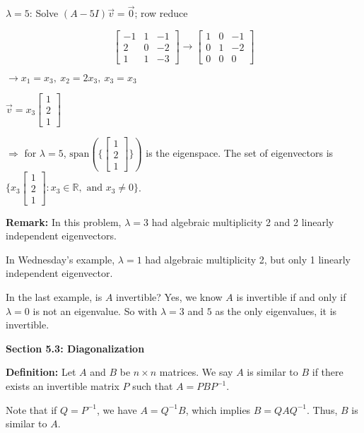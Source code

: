 \documentclass{article}
\begin{document}
\(\lambda = 5\): Solve \((A-5I)\vec{v} = \vec{0}\); row reduce

\[
\begin{bmatrix} -1 & 1 & -1 \\ 2 & 0 & -2 \\ 1 & 1 & -3 \end{bmatrix} \rightarrow \begin{bmatrix} 1 & 0 & -1 \\ 0 & 1 & -2 \\ 0 & 0 & 0 \end{bmatrix}
\]

\(\rightarrow x_1 = x_3, \ x_2 = 2x_3, \ x_3 = x_3\)

\(\vec{v} = x_3\begin{bmatrix} 1 \\ 2 \\ 1 \end{bmatrix}\)



\(\Rightarrow\) for \(\lambda = 5\), \(\text{span}(\{\begin{bmatrix} 1 \\ 2 \\ 1 \end{bmatrix}\})\) is the eigenspace. The set of eigenvectors is \(\{x_3\begin{bmatrix} 1 \\ 2 \\ 1 \end{bmatrix} : x_3 \in \mathbb{R}, \text{ and } x_3 \neq 0\}\).

\textbf{Remark:} In this problem, \(\lambda = 3\) had algebraic multiplicity 2 and 2 linearly independent eigenvectors.

In Wednesday's example, \(\lambda = 1\) had algebraic multiplicity 2, but only 1 linearly independent eigenvector.

In the last example, is \(A\) invertible? Yes, we know \(A\) is invertible if and only if \(\lambda = 0\) is not an eigenvalue. So with \(\lambda = 3\) and \(5\) as the only eigenvalues, it is invertible.


\textbf{Section 5.3: Diagonalization}

\textbf{Definition:} Let \( A \) and \( B \) be \( n \times n \) matrices. We say \( A \) is similar to \( B \) if there exists an invertible matrix \( P \) such that \( A = PBP^{-1} \).

Note that if \( Q = P^{-1} \), we have \( A = Q^{-1}B \), which implies \( B = QAQ^{-1} \). Thus, \( B \) is similar to \( A \).
\end{document}
